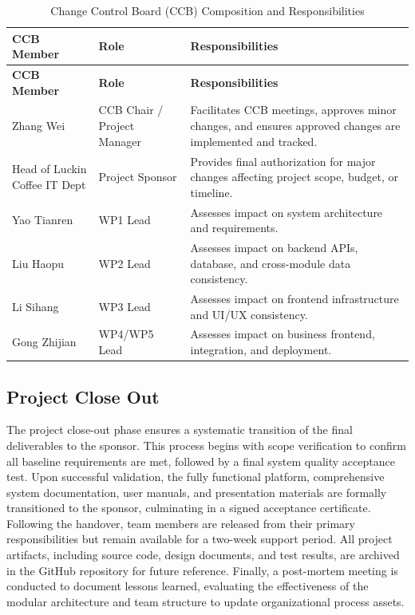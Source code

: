 \documentclass[12pt,a4paper]{article}
\begin{document}
{\footnotesize
\begin{longtable}{@{}>{\raggedright\arraybackslash}p{4cm}>{\raggedright\arraybackslash}p{4cm}>{\raggedright\arraybackslash}p{7cm}@{}}
\caption{Change Control Board (CCB) Composition and Responsibilities}\label{tab:ccb}\\
\toprule
\textbf{CCB Member} & \textbf{Role} & \textbf{Responsibilities} \\
\midrule
\endfirsthead
\toprule
\textbf{CCB Member} & \textbf{Role} & \textbf{Responsibilities} \\
\midrule
\endhead
Zhang Wei & CCB Chair / Project Manager & Facilitates CCB meetings, approves minor changes, and ensures approved changes are implemented and tracked. \\
\addlinespace
Head of Luckin Coffee IT Dept & Project Sponsor & Provides final authorization for major changes affecting project scope, budget, or timeline. \\
\addlinespace
Yao Tianren & WP1 Lead & Assesses impact on system architecture and requirements. \\
\addlinespace
Liu Haopu & WP2 Lead & Assesses impact on backend APIs, database, and cross-module data consistency. \\
\addlinespace
Li Sihang & WP3 Lead & Assesses impact on frontend infrastructure and UI/UX consistency. \\
\addlinespace
Gong Zhijian & WP4/WP5 Lead & Assesses impact on business frontend, integration, and deployment. \\
\bottomrule
\end{longtable}
}

\subsection{Project Close Out}
The project close-out phase ensures a systematic transition of the final deliverables to the sponsor. This process begins with scope verification to confirm all baseline requirements are met, followed by a final system quality acceptance test. Upon successful validation, the fully functional platform, comprehensive system documentation, user manuals, and presentation materials are formally transitioned to the sponsor, culminating in a signed acceptance certificate. Following the handover, team members are released from their primary responsibilities but remain available for a two-week support period. All project artifacts, including source code, design documents, and test results, are archived in the GitHub repository for future reference. Finally, a post-mortem meeting is conducted to document lessons learned, evaluating the effectiveness of the modular architecture and team structure to update organizational process assets.
\end{document}
